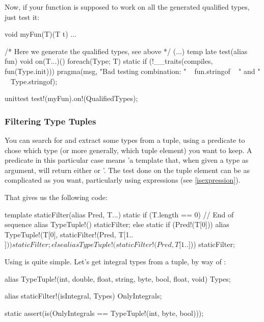 Now, if your function is supposed to work on all the generated qualified types, just test it:

\begin{dcode}
void myFun(T)(T t) { ... }

/* Here we generate the qualified types, see above */
(...) 
temp
late test(alias fun)
{
    void on(T...)()
    {
        foreach(Type; T)
            static if (!__traits(compiles, fun(Type.init)))
                pragma(msg, "Bad testing combination: " 
                          ~ fun.stringof ~ " and " ~ Type.stringof);
    }
}
   
unittest 
{
    test!(myFun).on!(QualifiedTypes);
}
\end{dcode}

\subsubsection{Filtering Type Tuples}\label{staticfilter}

You can search for and extract some types from a tuple, using a predicate to chose which type (or more generally, which tuple element) you want to keep. A predicate in this particular case means 'a template that, when given a type as argument, will return either  or '. The test done on the tuple element can be as complicated as you want, particularly using \DD{()} expressions (see \autoref{isexpression}).

That gives us the following code:

\begin{dcode}
template staticFilter(alias Pred, T...)
{
    static if (T.length == 0) // End of sequence
        alias TypeTuple!() staticFilter;
    else static if (Pred!(T[0]))
        alias TypeTuple!(T[0], staticFilter!(Pred, T[1..$])) staticFilter;
    else
        alias TypeTuple!(      staticFilter!(Pred, T[1..$])) staticFilter;
}
\end{dcode}

Using  is quite simple. Let's get integral types from a tuple, by way of :

\begin{dcode}
alias TypeTuple!(int, double, float, string, byte, bool, float, void) Types;

alias staticFilter!(isIntegral, Types) OnlyIntegrals;

static assert(is(OnlyIntegrals == TypeTuple!(int, byte, bool)));
\end{dcode}

